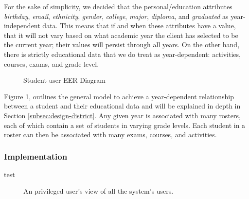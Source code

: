 For the sake of simplicity, we decided that the personal/education attributes \emph{birthday}, \emph{email}, \emph{ethnicity}, \emph{gender}, \emph{college}, \emph{major}, \emph{diploma}, and \emph{graduated} as year-independent data. This means that if and when these attributes have a value, that it will not vary based on what academic year the client has selected to be the current year; their values will persist through all years. On the other hand, there is strictly educational data that we do treat as year-dependent: activities, courses, exams, and grade level.

\begin{figure}[h!]
	\centering
	\caption{Student user EER Diagram}
	\label{fig:er-user-student}
\end{figure}

Figure \ref{fig:er-user-student}, outlines the general model to achieve a year-dependent relationship between a student and their educational data and will be explained in depth in Section \ref{subsec:design-district}. Any given year is associated with many rosters, each of which contain a set of students in varying grade levels. Each student in a roster can then be associated with many exams, courses, and activities. 

\subsubsection{Implementation}
test

\begin{figure}[h!]
	\centering
	\setlength\fboxsep{0pt}
	\caption{An privileged user's view of all the system's users.}
	\label{fig:screens-user-lust}
\end{figure}



